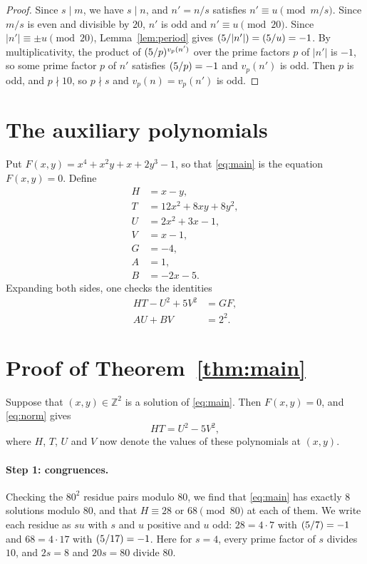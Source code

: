 \documentclass[11pt]{article}
\newcommand{\Z}{\mathbb{Z}}
\newcommand{\leg}[2]{\mathchoice{\biggl(\dfrac{#1}{#2}\biggr)}{(#1/#2)}{(#1/#2)}{(#1/#2)}}
\begin{document}
\begin{proof}
Since $s\mid m$, we have $s\mid n$, and $n'=n/s$ satisfies $n'\equiv u\pmod{m/s}$. Since $m/s$ is even and divisible by $20$, $n'$ is odd and $n'\equiv u\pmod{20}$. Since $|n'|\equiv\pm u\pmod{20}$, Lemma~\ref{lem:period} gives $\leg{5}{|n'|}=\leg{5}{u}=-1$. By multiplicativity, the product of $\leg{5}{p}^{v_p(n')}$ over the prime factors $p$ of $|n'|$ is $-1$, so some prime factor $p$ of $n'$ satisfies $\leg{5}{p}=-1$ and $v_p(n')$ is odd. Then $p$ is odd, and $p\nmid10$, so $p\nmid s$ and $v_p(n)=v_p(n')$ is odd.
\end{proof}

\section{The auxiliary polynomials}

Put $F(x,y)=x^{4}+x^{2}y+x+2y^{3}-1$, so that \eqref{eq:main} is the equation $F(x,y)=0$. Define
\begin{align*}
H&=x-y,\\
T&=12x^{2}+8xy+8y^{2},\\
U&=2x^{2}+3x-1,\\
V&=x-1,\\
G&=-4,\\
A&=1,\\
B&=-2x-5.
\end{align*}
Expanding both sides, one checks the identities
\begin{align}
HT-U^2+5V^2&=GF,\label{eq:norm}\\
AU+BV&=2^{2}.\label{eq:bezout}
\end{align}

\section{Proof of Theorem~\ref{thm:main}}

Suppose that $(x,y)\in\Z^2$ is a solution of \eqref{eq:main}. Then $F(x,y)=0$, and \eqref{eq:norm} gives
\begin{equation}\label{eq:HT}
HT=U^2-5V^2,
\end{equation}
where $H$, $T$, $U$ and $V$ now denote the values of these polynomials at $(x,y)$.

\paragraph{Step 1: congruences.} Checking the $80^2$ residue pairs modulo $80$, we find that \eqref{eq:main} has exactly 8 solutions modulo $80$, and that $H\equiv28\text{ or }68\pmod{80}$ at each of them. We write each residue as $su$ with $s$ and $u$ positive and $u$ odd: $28=4\cdot7$ with $\leg{5}{7}=-1$ and $68=4\cdot17$ with $\leg{5}{17}=-1$. Here for $s=4$, every prime factor of $s$ divides $10$, and $2s=8$ and $20s=80$ divide $80$.
\end{document}

